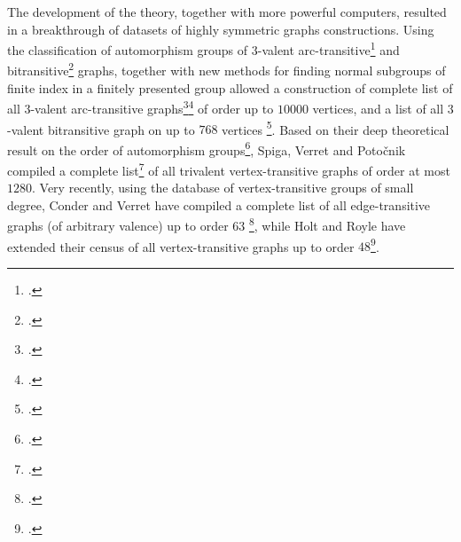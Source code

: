 The development of the theory, together with more powerful computers, resulted in a breakthrough of datasets of highly symmetric graphs constructions.
Using the classification of automorphism groups of $3$-valent
arc-transitive\footcite{DjokovicMiller_1980_RegularGroupsAutomorphisms} and bitransitive\footcite{Goldschmidt_1980_AutomorphismsTrivalentGraphs} graphs, together with new methods for finding normal subgroups of finite index in a finitely presented group allowed a construction of complete list of all $3$-valent arc-transitive graphs\footcite{ConderDobcsanyi_2002_TrivalentSymmetricGraphs}\footcite{Conder__TrivalentCubicSymmetric}  of order up to $10 000$ vertices, and a list of all $3$-valent bitransitive graph on up to $768$ vertices \footcite{ConderMalnicMarusicPotocnik_2006_CensusSemisymmetricCubic}.
Based on their deep theoretical result on the order of automorphism groups\footcite{PotocnikSpigaVerret_2015_BoundingOrderVertex}, Spiga, Verret and Potočnik compiled a complete list\footcite{PotocnikSpigaVerret_2015_Census4Valent}  of all trivalent vertex-transitive graphs of order at most $1280$.
Very recently, using the database of vertex-transitive groups of small degree, Conder and Verret have compiled a complete list of all edge-transitive graphs (of arbitrary valence) up to order $63$ \footcite{ConderVerret_2019_EdgeTransitiveGraphs}, while
Holt and Royle have extended their census of all vertex-transitive graphs up to order $48$\footcite{HoltRoyle_2020_CensusSmallTransitive}.


